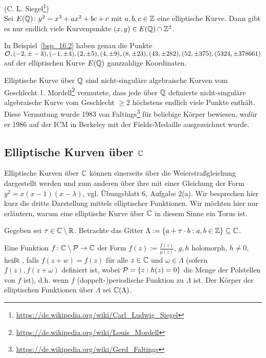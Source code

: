 \begin{satz}
	(C. L. Siegel\footnote{\url{https://de.wikipedia.org/wiki/Carl_Ludwig_Siegel}}) \\
	Sei $E(\mathbb{Q})\colon y^2 = x^3 + ax^2 + bc + c$ mit $a,b,c \in \mathbb{Z}$ eine elliptische Kurve.
	Dann gibt es nur endlich viele Kurvenpunkte $(x,y) \in E(\mathbb{Q}) \cap \mathbb{Z}^2$. 
\end{satz}

\begin{bem}
	In Beispiel~\ref{bsp_16.2} haben genau die Punkte $\mathcal{O}, (-2,\pm -3), (-1,\pm 4), (2,\pm 5), (4,\pm 9), (8, \pm 23), (43,\pm 282), (52, \pm 375), (5324, \pm 378661)$ auf der elliptischen Kurve $E(\mathbb{Q})$ ganzzahlige Koordinaten.
\end{bem}

\begin{bem}
	Elliptische Kurve über $\mathbb{Q}$ sind nicht-singuläre algebraische Kurven vom Geschlecht $1$. Mordell\footnote{\url{https://de.wikipedia.org/wiki/Louis_Mordell}} vermutete, dass jede über $\mathbb{Q}$ definierte nicht-singuläre algebraische Kurve vom Geschlecht $\geq 2$ höchstens endlich viele Punkte enthält.
	Diese Vermutung wurde 1983 von Faltings\footnote{\url{https://de.wikipedia.org/wiki/Gerd_Faltings}} für beliebige Körper bewiesen, wofür er 1986 auf der ICM in Berkeley mit der Fields-Medaille ausgezeichnet wurde.
\end{bem}

\newpage
\subsection{Elliptische Kurven über $\mathbb{C}$}
\label{sub:3.2}
\begin{bem}
	Elliptische Kurven über $\mathbb{C}$ können einerseits über die Weierstraßgleichung dargestellt werden und zum anderen über ihre  mit einer Gleichung der Form $y^2 = x(x-1)(x-\lambda)$, vgl. Übungsblatt 6, Aufgabe 2(a).
	Wir besprechen hier kurz die dritte Darstellung mittels elliptischer Funktionen.
	Wir möchten hier nur erläutern, warum eine elliptische Kurve über $\mathbb{C}$ in diesem Sinne ein Torus ist.
	
	Gegeben sei $\tau \in \mathbb{C} \setminus \mathbb{R}$. Betrachte das Gitter $\Lambda := \{ a + \tau \cdot b : a,b \in \mathbb{Z}\} \subseteq \mathbb{C}$.	
\end{bem}

\begin{defn}
	Eine Funktion $f\colon \mathbb{C} \setminus \mathcal{P} \rightarrow \mathbb{C}$ der Form $f(z) := \frac{f(z)}{g(z)}$, $g,h$ holomorph, $h \neq 0$, heißt , falls $f(z+w) = f(z)$ für alle $z \in \mathbb{C}$ und $\omega \in \Lambda$ (sofern $f(z), f(z+\omega)$ definiert ist, wobei $\mathcal{P} = \{z : h(z) = 0\}$ die Menge der Polstellen von $f$ ist), d.h. wenn $f$ (doppelt-)periodische Funktion zu $\Lambda$ ist.
	Der Körper der elliptischen Funktionen über $\Lambda$ sei $\mathbb{C}(\Lambda)$. 
\end{defn}

